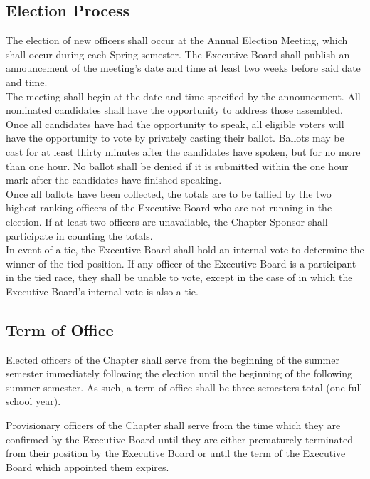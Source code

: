 \documentclass{article}
\begin{document}
\subsection{Election Process}

The election of new officers shall occur at the Annual Election Meeting,
which shall occur during each Spring semester. The Executive Board shall
publish an announcement of the meeting's date and time at least two
weeks before said date and time.\\

The meeting shall begin at the date and time specified by the
announcement. All nominated candidates shall have the opportunity to
address those assembled. Once all candidates have had the opportunity to
speak, all eligible voters will have the opportunity to vote by
privately casting their ballot. Ballots may be cast for at least thirty
minutes after the candidates have spoken, but for no more than one hour.
No ballot shall be denied if it is submitted within the one hour mark
after the candidates have finished speaking.\\

Once all ballots have been collected, the totals are to be tallied by
the two highest ranking officers of the Executive Board who are not
running in the election. If at least two officers are unavailable, the
Chapter Sponsor shall participate in counting the totals.\\

In event of a tie, the Executive Board shall hold an internal vote to
determine the winner of the tied position. If any officer of the
Executive Board is a participant in the tied race, they shall be unable
to vote, except in the case of in which the Executive Board's internal
vote is also a tie.


\subsection{Term of Office}

Elected officers of the Chapter shall serve from the beginning of the
summer semester immediately following the election until the beginning
of the following summer semester. As such, a term of office shall be
three semesters total (one full school year).

Provisionary officers of the Chapter shall serve from the time which
they are confirmed by the Executive Board until they are either
prematurely terminated from their position by the Executive Board or
until the term of the Executive Board which appointed them expires.
\end{document}
